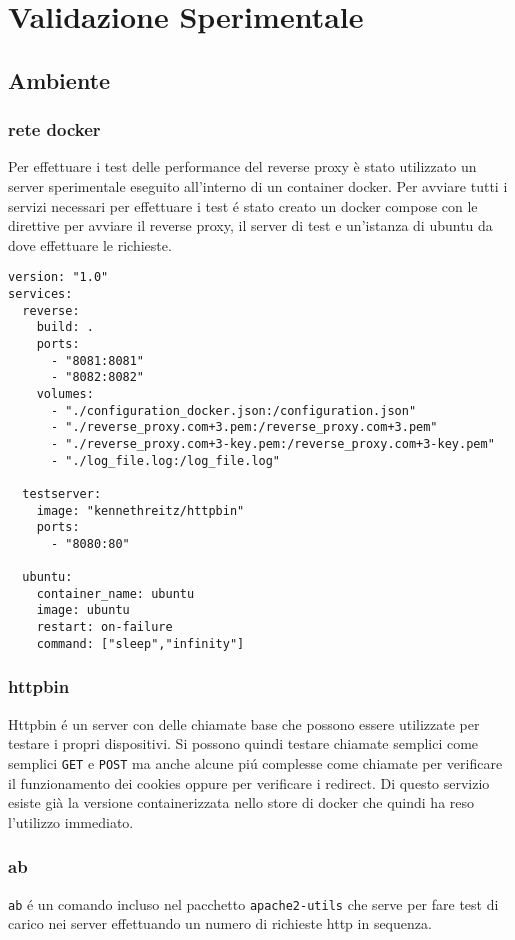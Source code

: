 \chapter{Validazione Sperimentale}
\label{cha:Sperimentale}

\section{Ambiente}
\subsection{rete docker}
Per effettuare i test delle performance del reverse proxy è stato utilizzato un server sperimentale eseguito all'interno di un container docker. Per avviare tutti i servizi necessari per effettuare i test é stato creato un docker compose con le direttive per avviare il reverse proxy, il server di test e un'istanza di ubuntu da dove effettuare le richieste.

\begin{lstlisting}[language=DockerCompose]
version: "1.0"
services:
  reverse:
    build: .
    ports:
      - "8081:8081"
      - "8082:8082"
    volumes:
      - "./configuration_docker.json:/configuration.json"
      - "./reverse_proxy.com+3.pem:/reverse_proxy.com+3.pem"
      - "./reverse_proxy.com+3-key.pem:/reverse_proxy.com+3-key.pem"
      - "./log_file.log:/log_file.log"

  testserver:
    image: "kennethreitz/httpbin"
    ports:
      - "8080:80"

  ubuntu:
    container_name: ubuntu
    image: ubuntu
    restart: on-failure
    command: ["sleep","infinity"]

\end{lstlisting}

\subsection{httpbin}
\cite{httpbin}
Httpbin é un server con delle chiamate base che possono essere utilizzate per testare i propri dispositivi. Si possono quindi testare chiamate semplici come semplici \texttt{GET} e \texttt{POST} ma anche alcune piú complesse come chiamate per verificare il funzionamento dei cookies oppure per verificare i redirect. Di questo servizio esiste già la versione containerizzata nello store di docker che quindi ha reso l'utilizzo immediato.

\subsection{ab}
\cite{ab}
\texttt{ab} é un comando incluso nel pacchetto \texttt{apache2-utils} che serve per fare test di carico nei server effettuando un numero di richieste http in sequenza.

